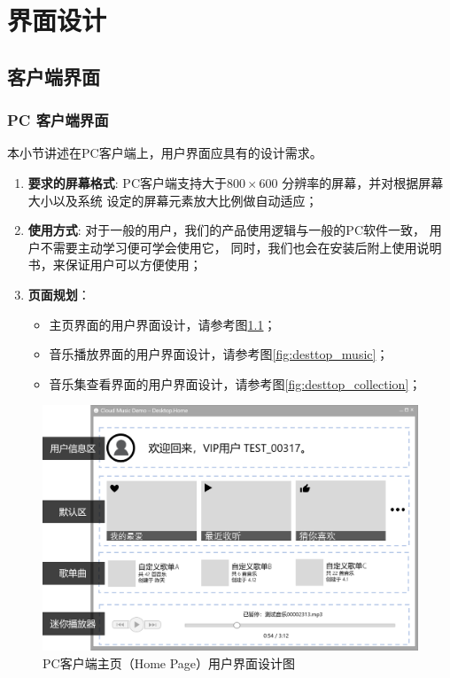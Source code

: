 \chapter{界面设计}
\section{客户端界面}

\subsection{PC 客户端界面} %
\label{sub:pc_客户端界面}

本小节讲述在PC客户端上，用户界面应具有的设计需求。

\begin{enumerate}
	\item \textbf{要求的屏幕格式}:
		PC客户端支持大于$800 \times 600$ 分辨率的屏幕，并对根据屏幕大小以及系统
		设定的屏幕元素放大比例做自动适应；
	\item \textbf{使用方式}:
		对于一般的用户，我们的产品使用逻辑与一般的PC软件一致，
			用户不需要主动学习便可学会使用它，
		同时，我们也会在安装后附上使用说明书，来保证用户可以方便使用；
	\item \textbf{页面规划}： 
	\begin{itemize}
		\item 主页界面的用户界面设计，请参考图\ref{fig:desttop_home}；
		\item 音乐播放界面的用户界面设计，请参考图\ref{fig:desttop_music}；
		\item 音乐集查看界面的用户界面设计，请参考图\ref{fig:desttop_collection}；
	\end{itemize}
\end{enumerate}

\newpage
\begin{figure}[h!]
  \centering

  \includegraphics[width=.95\linewidth]{figures/desttop_home}

  \caption{  \label{fig:desttop_home}
  		PC客户端主页（Home Page）用户界面设计图
    }
\end{figure}

